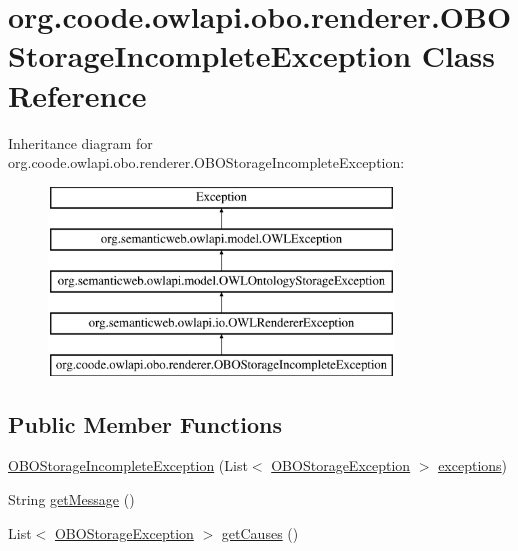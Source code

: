 \hypertarget{classorg_1_1coode_1_1owlapi_1_1obo_1_1renderer_1_1_o_b_o_storage_incomplete_exception}{\section{org.\-coode.\-owlapi.\-obo.\-renderer.\-O\-B\-O\-Storage\-Incomplete\-Exception Class Reference}
\label{classorg_1_1coode_1_1owlapi_1_1obo_1_1renderer_1_1_o_b_o_storage_incomplete_exception}
}
Inheritance diagram for org.\-coode.\-owlapi.\-obo.\-renderer.\-O\-B\-O\-Storage\-Incomplete\-Exception\-:\begin{figure}[H]
\begin{center}
\leavevmode
\includegraphics[height=5.000000cm]{classorg_1_1coode_1_1owlapi_1_1obo_1_1renderer_1_1_o_b_o_storage_incomplete_exception}
\end{center}
\end{figure}
\subsection*{Public Member Functions}
\begin{DoxyCompactItemize}
\item 
\hyperlink{classorg_1_1coode_1_1owlapi_1_1obo_1_1renderer_1_1_o_b_o_storage_incomplete_exception_a68fe799e93257c19d38d8818d1d56d04}{O\-B\-O\-Storage\-Incomplete\-Exception} (List$<$ \hyperlink{classorg_1_1coode_1_1owlapi_1_1obo_1_1renderer_1_1_o_b_o_storage_exception}{O\-B\-O\-Storage\-Exception} $>$ \hyperlink{classorg_1_1coode_1_1owlapi_1_1obo_1_1renderer_1_1_o_b_o_storage_incomplete_exception_a8a65c3684f3cc8d13c26409ca8fbb412}{exceptions})
\item 
String \hyperlink{classorg_1_1coode_1_1owlapi_1_1obo_1_1renderer_1_1_o_b_o_storage_incomplete_exception_a95f0a9c2336631c61ef6411cf1a6c422}{get\-Message} ()
\item 
List$<$ \hyperlink{classorg_1_1coode_1_1owlapi_1_1obo_1_1renderer_1_1_o_b_o_storage_exception}{O\-B\-O\-Storage\-Exception} $>$ \hyperlink{classorg_1_1coode_1_1owlapi_1_1obo_1_1renderer_1_1_o_b_o_storage_incomplete_exception_a34c9f8598882854aa60bbbfc09eb3025}{get\-Causes} ()
\end{DoxyCompactItemize}
